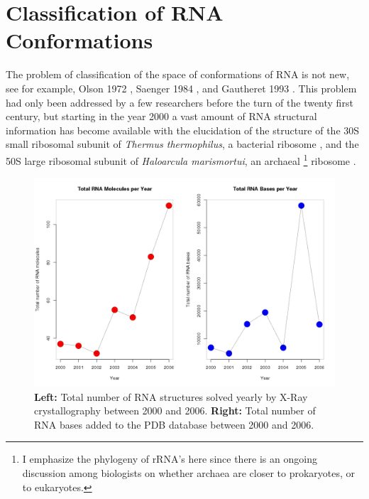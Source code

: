 \chapter{Classification of  RNA Conformations}
%
%

\label{clustering} 

The problem of classification of the space of conformations
of  RNA is  not new,  see  for example,  Olson 1972  \cite{olson1972},
Saenger     1984     \cite{saenger1984},     and    Gautheret     1993
\cite{gautheret1993}.  This problem  had  only been  addressed by  a few
researchers before the  turn of the twenty first century,  but starting in
the year 2000  a vast amount of RNA  structural information has become
available  with the  elucidation of  the  structure of  the 30S  small
ribosomal  subunit  of   \textit{Thermus  thermophilus},  a  bacterial
ribosome   \cite{wimberly2000,schluenzen2000},  and   the   50S  large
ribosomal subunit of \textit{Haloarcula marismortui}, an archaeal
\footnote{I emphasize the  phylogeny of rRNA's here since  there is an
  ongoing discussion among biologists on whether archaea are  closer
  to prokaryotes, or to eukaryotes.}  ribosome \cite{ban2000}.

\begin{figure}[H]
\centering
\includegraphics[scale=0.4]{Chapter1/rna_per_year.png}
\caption{\textbf{Left:} Total number of RNA structures solved yearly by X-Ray 
crystallography between 2000 and 2006. \textbf{Right:} Total number of 
RNA bases added to the PDB database between 2000 and 2006.}
\label{fig:rnainpdb}
\end{figure}

